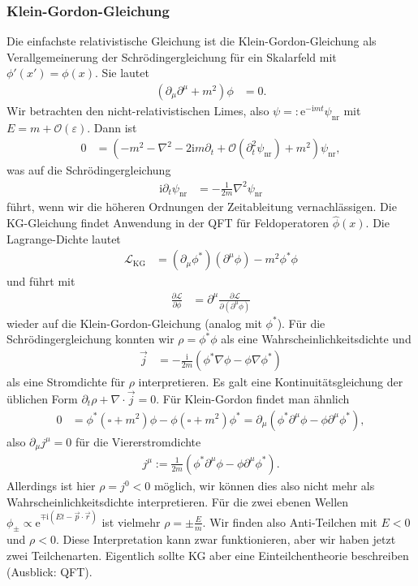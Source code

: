 \documentclass[english, parskip=full]{scrreport}
\newcommand{\kla}{}
\newcommand{\tecxt}{}
\renewcommand{\i}{\text{i}}
\newcommand{\e}{\text{e}}
\begin{document}
\subsubsection{Klein-Gordon-Gleichung}
Die einfachste relativistische Gleichung ist die Klein-Gordon-Gleichung als Verallgemeinerung der Schrödingergleichung für ein Skalarfeld mit $\phi'(x') = \phi(x)$.
Sie lautet 
\begin{align}
\kla\left( \partial_\mu\partial^\mu + m^2 \right)\phi &= 0.
\end{align}
Wir betrachten den nicht-relativistischen Limes, also $\psi =: \e^{-\i mt}\psi_\tecxt\text{nr} $ mit $E=m+\mathcal{O}(\varepsilon)$.
Dann ist
\begin{align}
0 &= \kla\left( -m^2 - \nabla^2 - 2\i m\partial_t + \mathcal{O}\kla\left( \partial_t^2\psi_\tecxt\text{nr} \right) + m^2 \right)\psi_\tecxt\text{nr},
\end{align}
was auf die Schrödingergleichung
\begin{align}
\i\partial_t\psi_\tecxt\text{nr} &= -\frac{1}{2m}\nabla^2\psi_\tecxt\text{nr}
\end{align}
führt, wenn wir die höheren Ordnungen der Zeitableitung vernachlässigen.
Die KG-Gleichung findet Anwendung in der QFT für Feldoperatoren $\hat{\phi}(x)$.
Die Lagrange-Dichte lautet
\begin{align}
\mathcal{L}_\tecxt\text{KG} &= \kla\left( \partial_\mu\phi^\ast \right)\kla\left( \partial^\mu \phi \right) - m^2\phi^\ast\phi
\end{align}
und führt mit 
\begin{align}
\frac{\partial\mathcal{L}}{\partial \phi} &= \partial^\mu \frac{\partial\mathcal{L}}{\partial (\partial^\mu\phi)}
\end{align}
wieder auf die Klein-Gordon-Gleichung (analog mit $\phi^\ast$).
Für die Schrödingergleichung konnten wir $\rho = \phi^\ast\phi$ als eine Wahrscheinlichkeitsdichte und 
\begin{align}
\vec{j} &= -\frac{\i}{2m}\kla\left( \phi^\ast\nabla\phi - \phi\nabla\phi^\ast \right)
\end{align}
als eine Stromdichte für $\rho$ interpretieren.
Es galt eine Kontinuitätsgleichung der üblichen Form $\partial_t\rho + \nabla\cdot\vec{j} = 0$.
Für Klein-Gordon findet man ähnlich
\begin{align}
0 &= \phi^\ast\kla\left( \square + m^2 \right)\phi -\phi\kla\left( \square + m^2 \right)\phi^\ast = \partial_\mu \kla\left( \phi^\ast\partial^\mu\phi - \phi\partial^\mu\phi^\ast \right),
\end{align}
also $\partial_\mu j^\mu = 0$ für die Viererstromdichte %
\begin{align}
j^\mu := \frac{1}{2m}\kla\left( \phi^\ast \partial^\mu\phi - \phi \partial^\mu\phi^\ast \right).
\end{align}
Allerdings ist hier $\rho = j^0 < 0$ möglich, wir können dies also nicht mehr als Wahrscheinlichkeitsdichte interpretieren.
Für die zwei ebenen Wellen $\phi_\pm \propto \e^{\mp\i(Et - \vec{p}\cdot\vec{r})}$ ist vielmehr $\rho = \pm \frac{E}{m}$.
Wir finden also Anti-Teilchen mit $E<0$ und $\rho< 0$.
Diese Interpretation kann zwar funktionieren, aber wir haben jetzt zwei Teilchenarten.
Eigentlich sollte KG aber eine Einteilchentheorie beschreiben (Ausblick: QFT).
\end{document}
